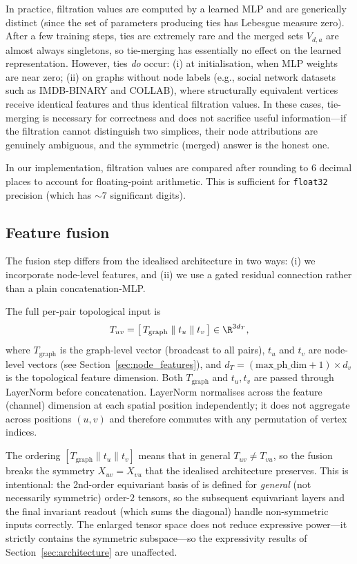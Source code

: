 \begin{remark}
In practice, filtration values are computed by a learned MLP and are generically distinct (since the set of parameters producing ties has Lebesgue measure zero). After a few training steps, ties are extremely rare and the merged sets $V_{d,a}$ are almost always singletons, so tie-merging has essentially no effect on the learned representation. However, ties \emph{do} occur: (i) at initialisation, when MLP weights are near zero; (ii) on graphs without node labels (e.g., social network datasets such as IMDB-BINARY and COLLAB), where structurally equivalent vertices receive identical features and thus identical filtration values. In these cases, tie-merging is necessary for correctness and does not sacrifice useful information---if the filtration cannot distinguish two simplices, their node attributions are genuinely ambiguous, and the symmetric (merged) answer is the honest one.

In our implementation, filtration values are compared after rounding to $6$ decimal places to account for floating-point arithmetic. This is sufficient for \texttt{float32} precision (which has $\sim$7 significant digits).
\end{remark}


\subsection{Feature fusion}
\label{sec:fusion}

The fusion step differs from the idealised architecture in two ways: (i) we incorporate node-level features, and (ii) we use a gated residual connection rather than a plain concatenation-MLP.

The full per-pair topological input is
\[
    T_{uv} = \big[\, T_{\mathrm{graph}} \;\Vert\; t_u \;\Vert\; t_v \,\big] \in \R^{3 d_T},
\]
where $T_{\mathrm{graph}}$ is the graph-level vector (broadcast to all pairs), $t_u$ and $t_v$ are node-level vectors (see Section~\ref{sec:node_features}), and $d_T = (\text{max\_ph\_dim} + 1) \times d_v$ is the topological feature dimension. Both $T_{\mathrm{graph}}$ and $t_u, t_v$ are passed through LayerNorm before concatenation. LayerNorm normalises across the feature (channel) dimension at each spatial position independently; it does not aggregate across positions $(u,v)$ and therefore commutes with any permutation of vertex indices.

\begin{remark}[Asymmetry of $T_{uv}$]
\label{rmk:asymmetry}
The ordering $[T_{\mathrm{graph}} \| t_u \| t_v]$ means that in general $T_{uv} \neq T_{vu}$, so the fusion breaks the symmetry $X_{uv} = X_{vu}$ that the idealised architecture preserves. This is intentional: the 2nd-order equivariant basis of \cite{maron2019provably} is defined for \emph{general} (not necessarily symmetric) order-$2$ tensors, so the subsequent equivariant layers and the final invariant readout (which sums the diagonal) handle non-symmetric inputs correctly. The enlarged tensor space does not reduce expressive power---it strictly contains the symmetric subspace---so the expressivity results of Section~\ref{sec:architecture} are unaffected.
\end{remark}

